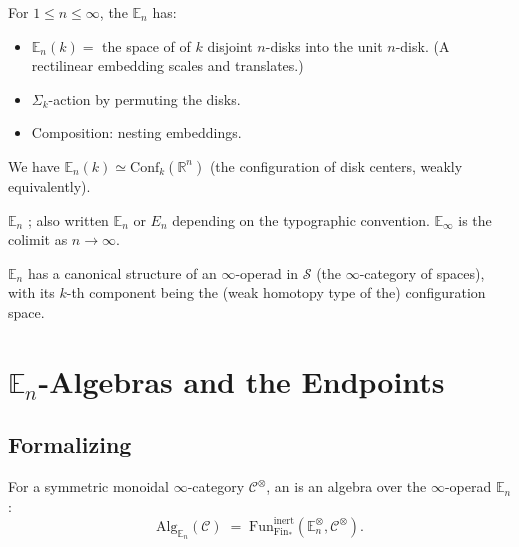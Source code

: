 \begin{definition}
\label{def:little-disks}
For $1 \leq n \leq \infty$, the 
$\mathbb{E}_n$ has:
\begin{itemize}
  \item $\mathbb{E}_n(k) = $ the space of 
        of $k$ disjoint $n$-disks into the unit $n$-disk. (A rectilinear
        embedding scales and translates.)
  \item $\Sigma_k$-action by permuting the disks.
  \item Composition: nesting embeddings.
\end{itemize}
We have $\mathbb{E}_n(k) \simeq \mathrm{Conf}_k(\mathbb{R}^n)$ (the
configuration of disk centers, weakly equivalently).
\end{definition}

\begin{howtosay}
$\mathbb{E}_n$ ;
also written $\mathbb{E}_n$ or $E_n$ depending on the typographic
convention. $\mathbb{E}_\infty$ is the colimit as $n \to \infty$.
\end{howtosay}

\begin{theorem}
\label{thm:en-infty-operad}
$\mathbb{E}_n$ has a canonical structure of an $\infty$-operad in
$\mathcal{S}$ (the $\infty$-category of spaces), with its $k$-th
component being the (weak homotopy type of the) configuration space.
\end{theorem}


\section{$\mathbb{E}_n$-Algebras and the Endpoints}
\label{sec:en-algebras}

\subsection{Formalizing}

\begin{definition}
\label{def:en-algebra}
For a symmetric monoidal $\infty$-category $\mathcal{C}^\otimes$, an
 is an algebra over the
$\infty$-operad $\mathbb{E}_n$:
\begin{equation*}
  \mathrm{Alg}_{\mathbb{E}_n}(\mathcal{C}) \;=\; \mathrm{Fun}_{\mathrm{Fin}_*}^{\mathrm{inert}}(\mathbb{E}_n^\otimes, \mathcal{C}^\otimes).
\end{equation*}
\end{definition}


